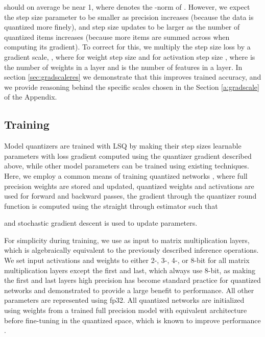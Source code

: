 \documentclass{article}
\begin{document}
should on average be near 1, where  denotes the -norm of . 
However, we expect the step size parameter to be smaller as precision increases (because the data is quantized more finely), and step size updates to be larger as the number of quantized items increases (because more items are summed across when computing its gradient).
To correct for this, we multiply the step size loss by a gradient scale, , where for weight step size  and for activation step size , where  is the number of weights in a layer and  is the number of features in a layer.
In section \ref{sec:gradscaleres} we demonstrate that this improves trained accuracy, and we provide reasoning behind the specific scales chosen in the Section \ref{a:gradscale} of the Appendix.






\subsection{Training}
\label{methods:training}

Model quantizers are trained with LSQ by making their step sizes learnable parameters with loss gradient computed using the quantizer gradient described above, while other model parameters can be trained using existing techniques.
Here, we employ a common means of training quantized networks \citep{courbariaux2015binaryconnect},
where full precision weights are stored and updated, quantized weights and activations are used for forward and backward passes, the gradient through the quantizer round function is computed using the straight through estimator \citep{bengio2013estimating} such that

and stochastic gradient descent is used to update parameters.


For simplicity during training, we use  as input to matrix multiplication layers, which is algebraically equivalent to the previously described inference operations.
We set input activations and weights to either 2-, 3-, 4-, or 8-bit for all matrix multiplication layers except the first and last, which always use 8-bit, as making the first and last layers high precision has become standard practice for quantized networks and demonstrated to provide a large benefit to performance.  All other parameters are represented using fp32.
All quantized networks are initialized using weights from a trained full precision model with equivalent architecture before fine-tuning in the quantized space, which is known to improve performance \citep{sung2015resiliency,zhou2016dorefa,mishra2017apprentice,mckinstry2018discovering}.
\end{document}
